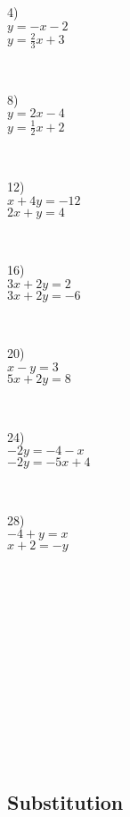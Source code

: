 \begin{multicols}{4}
  4)\\
  $y = - x - 2$\\
	$y = \frac{2}{3} x + 3$\par
  ~\par
  8)\\
  $y = 2 x - 4$\\
	$y = \frac{1}{2} x + 2$\par
  ~\par
  12)\\
  $x + 4 y = - 12$\\
	$2 x + y = 4$\par
  ~\par
  16)\\
  $3 x + 2 y = 2$\\
	$3 x + 2 y = - 6$\par
  ~\par
  20)\\
  $x - y = 3$\\
	$5 x + 2 y = 8$\par
  ~\par
	24)\\
  $- 2 y = - 4 - x$\\
	$- 2 y = - 5 x + 4$\par
  ~\par
  28)\\
  $- 4 + y = x$\\
	$x + 2 = - y$\par
  ~\par
	~\par
	~\par
	~\par
	~\par
	~\par
  ~\par
	
\end{multicols}

\newpage

\subsection{Substitution}\par

{}


